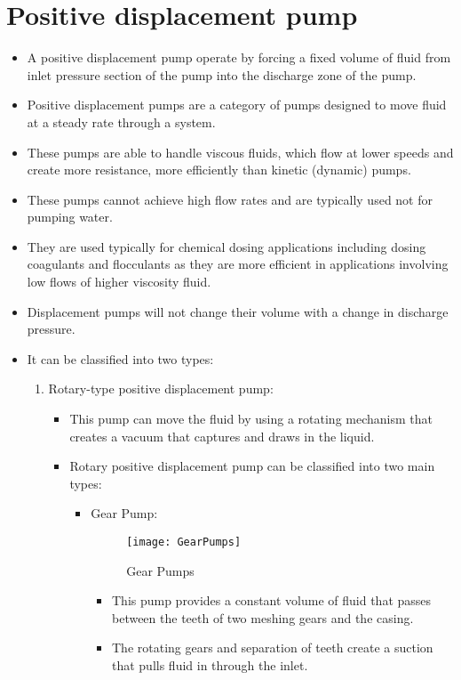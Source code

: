 \section{Positive displacement pump}
\begin{itemize}
\item A positive displacement pump operate by forcing a fixed volume of fluid from inlet pressure section of the pump into the discharge zone of the pump. 
\item Positive displacement pumps are a category of pumps designed to move fluid at a steady rate through a system.
\item These pumps are able to handle viscous fluids, which flow at lower speeds and create more resistance, more efficiently than kinetic (dynamic) pumps.
\item These pumps cannot achieve high flow rates and are typically used not for pumping water.
\item They are used typically for chemical dosing applications including dosing coagulants and flocculants as they are more efficient in applications involving low flows of higher viscosity fluid.
\item Displacement pumps will not change their volume with a change in discharge pressure.
\item It can be classified into two types:
\begin{enumerate}
\item Rotary-type positive displacement pump: 
\begin{itemize}
\item This pump can move the fluid by using a rotating mechanism that creates a vacuum that captures and draws in the liquid. 
\item Rotary positive displacement pump can be classified into two main types:
\begin{itemize}
\item Gear Pump:
\begin{figure}[h]
\begin{center}
\texttt{[image: GearPumps]}
\caption{Gear Pumps}
\end{center}
\end{figure} 
\begin{itemize}
\item This pump provides a constant volume of fluid that passes between the teeth of two meshing gears and the casing.
\item The rotating gears and separation of teeth create a suction that pulls fluid in through the inlet. 

\end{itemize}
\end{itemize}
\end{itemize}
\end{enumerate}
\end{itemize}
